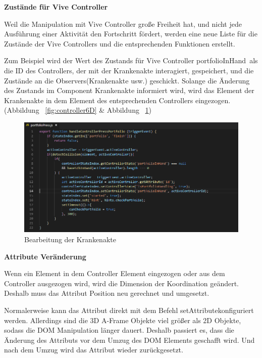   \textbf{Zustände für Vive Controller}
  
  Weil die Manipulation mit Vive Controller große Freiheit hat, und nicht jede Ausführung einer Aktivität den Fortschritt fördert, werden eine neue Liste für die Zustände der Vive Controllers und die entsprechenden Funktionen erstellt.
  
  Zum Beispiel wird der Wert des Zustands für Vive Controller \glqq portfolioInHand\grqq\ als die ID des Controllers, der mit der Krankenakte interagiert, gespeichert, und die Zustände an die Observers(Krankenakte usw.) geschickt. Solange die Änderung des Zustands im Component Krankenakte informiert wird, wird das Element der Krankenakte in dem Element des entsprechenden Controllers eingezogen. (Abbildung ~\ref{fig:controller6D} \& Abbildung ~\ref{fig:portfolioPress})
  
\begin{figure}[ht]
\vspace*{0.3cm}
\centering
\includegraphics[width=\textwidth]{images/portfolioPress.png}
\caption[Bearbeitung der Krankenakte]{Bearbeitung der Krankenakte}
\label{fig:portfolioPress} 
\end{figure}
  
  \textbf{Attribute Veränderung}
  
  Wenn ein Element in dem Controller Element eingezogen oder aus dem Controller ausgezogen wird, wird die Dimension der Koordination geändert. Deshalb muss das Attribut Position neu gerechnet und umgesetzt.
  
  Normalerweise kann das Attribut direkt mit dem Befehl \glqq setAttribute\grqq konfiguriert werden. Allerdings sind die 3D A-Frame Objekte viel größer als 2D Objekte, sodass die DOM Manipulation länger dauert. Deshalb passiert es, dass die Änderung des Attributs vor dem Umzug des DOM Elements geschafft wird. Und nach dem Umzug wird das Attribut wieder zurückgesetzt.
  
